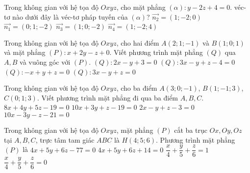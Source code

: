 \begin{ex}%
Trong không gian với hệ tọa độ $Oxyz$, cho mặt phẳng $(\alpha): y-2z+4=0$. véc-tơ nào dưới đây là véc-tơ pháp tuyến của $(\alpha)$?
\choice 
{$\overrightarrow{n_2}=(1;-2;0)$}
{\True $\overrightarrow{n_1}=(0;1;-2)$}
{$\overrightarrow{n_3}=(1;0;-2)$}
{$\overrightarrow{n_4}=(1;-2;4)$}  
\end{ex} 

\begin{ex}%
Trong không gian với hệ tọa độ $Oxyz$, cho hai điểm $A(2;1;-1)$ và $B(1;0;1)$ và mặt phẳng $(P): x+2y-z+0$. Viết phương trình mặt phẳng $(Q)$ qua $A, B$ và vuông góc với $(P)$.
\choice 
{$(Q): 2x-y+3=0$}
{\True $(Q): 3x-y+z-4=0$}
{$(Q): -x+y+z=0$}
{$(Q): 3x-y+z=0$}  
\end{ex}  

\begin{ex}%
Trong không gian với hệ tọa độ $Oxyz$, cho ba điểm $A(3;0;-1)$, $B(1;-1;3)$, $C(0;1;3)$. Viết phương trình mặt phẳng đi qua ba điểm $A, B, C$.
\choice 
{\True $8x+4y+5z-19=0$}
{$10x+3y+z-19=0$}
{$2x-y+z-3=0$}
{$10x-3y-z-21=0$}  
\end{ex} 

\begin{ex}%
Trong không gian với hệ tọa độ $Oxyz$, mặt phẳng $(P)$ cắt ba trục $Ox, Oy, Oz$ tại $A, B, C$, trực tâm tam giác $ABC$ là $H(4;5;6)$. Phương trình mặt phẳng $(P)$ là 
\choice 
{\True $4x+5y+6z-77=0$}
{$4x+5y+6z+14=0$}
{$\dfrac{x}{4}+\dfrac{y}{5}+\dfrac{z}{6}=1$}
{$\dfrac{x}{4}+\dfrac{y}{5}+\dfrac{z}{6}=0$}
\end{ex} 

